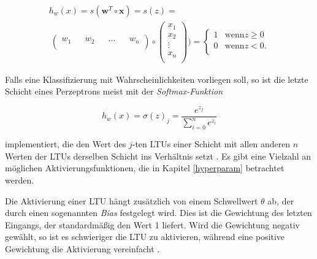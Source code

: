 \begin{equation} \label{heaviside}
\begin{split}
h_{w}(x) = s(\boldsymbol{w}^{T} \circ \boldsymbol{x}) = s(z) = \\\ \begin{pmatrix} 
w_{1}&&w_{2}&&\dots&& w_{n}\\ 
\end{pmatrix} 
\circ 
\begin{pmatrix} x_{1}\\
x_{2}\\
\vdots\\
x_{n}\\
\end{pmatrix}) = 
\begin{cases}
1 & \text{wenn} z \geq 0 \\
0 & \text{wenn} z < 0 .\\
\end{cases}
\end{split}
\end{equation}

Falls eine Klassifizierung mit Wahrscheinlichkeiten vorliegen soll, so ist die letzte Schicht eines Perzeptrons meist mit der \textit{Softmax-Funktion}

\begin{equation} \label{softmax}
h_{w}(x) = \sigma(z)_j = \frac{e^{z_j}}{\sum_{i=0}^n e^{z_i} }
\end{equation}

implementiert, die den Wert des $j$-ten LTUs einer Schicht mit allen anderen $n$ Werten der LTUs derselben Schicht ins Verhältnis setzt \cite{AurelienGeron.2018}. Es gibt eine Vielzahl an möglichen Aktivierungsfunktionen, die in Kapitel \ref{hyperparam} betrachtet werden.


Die Aktivierung einer LTU hängt zusätzlich von einem Schwellwert $\theta$ ab, der durch einen sogenannten \textit{Bias} festgelegt wird. Dies ist die Gewichtung des letzten Eingangs, der standardmäßig den Wert 1 liefert. Wird die Gewichtung negativ gewählt, so ist es schwieriger die LTU zu aktivieren, während eine positive Gewichtung die Aktivierung vereinfacht \cite{AurelienGeron.2018}.

